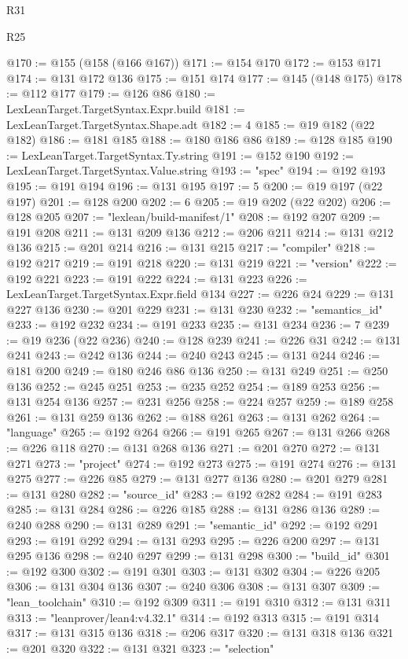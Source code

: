 \begin{lexlean}{R31}
\begin{lexlean}{R25}
\begin{coremodule}
{{{{{{{{{{{{{{{{{{{{{{{{{{{{{{{{{{{{{{{{{{{{{{{{{{{{{{{{{{{{{{{{{{{{{{{{{{{{{{{{{{{{{{{{{{{{{{{{{{{{{{{{{{{{{{{{{{{{{{{{{{{{{{{{{{{{{{{{{{{{{{{{{{{{{{{{{{{{{{{{{{{{{{{{{{{{{{{{{{{{{{{{{{{{{{{{{{{{{{{@170 := @155 (@158 (@166 @167))
@171 := @154 @170
@172 := @153 @171
@174 := @131 @172 @136
@175 := @151 @174
@177 := @145 (@148 @175)
@178 := @112 @177
@179 := @126 @86
@180 := LexLeanTarget.TargetSyntax.Expr.build
@181 := LexLeanTarget.TargetSyntax.Shape.adt
@182 := 4
@185 := @19 @182 (@22 @182)
@186 := @181 @185
@188 := @180 @186 @86
@189 := @128 @185
@190 := LexLeanTarget.TargetSyntax.Ty.string
@191 := @152 @190
@192 := LexLeanTarget.TargetSyntax.Value.string
@193 := "spec"
@194 := @192 @193
@195 := @191 @194
@196 := @131 @195
@197 := 5
@200 := @19 @197 (@22 @197)
@201 := @128 @200
@202 := 6
@205 := @19 @202 (@22 @202)
@206 := @128 @205
@207 := "lexlean/build-manifest/1"
@208 := @192 @207
@209 := @191 @208
@211 := @131 @209 @136
@212 := @206 @211
@214 := @131 @212 @136
@215 := @201 @214
@216 := @131 @215
@217 := "compiler"
@218 := @192 @217
@219 := @191 @218
@220 := @131 @219
@221 := "version"
@222 := @192 @221
@223 := @191 @222
@224 := @131 @223
@226 := LexLeanTarget.TargetSyntax.Expr.field @134
@227 := @226 @24
@229 := @131 @227 @136
@230 := @201 @229
@231 := @131 @230
@232 := "semantics_id"
@233 := @192 @232
@234 := @191 @233
@235 := @131 @234
@236 := 7
@239 := @19 @236 (@22 @236)
@240 := @128 @239
@241 := @226 @31
@242 := @131 @241
@243 := @242 @136
@244 := @240 @243
@245 := @131 @244
@246 := @181 @200
@249 := @180 @246 @86 @136
@250 := @131 @249
@251 := @250 @136
@252 := @245 @251
@253 := @235 @252
@254 := @189 @253
@256 := @131 @254 @136
@257 := @231 @256
@258 := @224 @257
@259 := @189 @258
@261 := @131 @259 @136
@262 := @188 @261
@263 := @131 @262
@264 := "language"
@265 := @192 @264
@266 := @191 @265
@267 := @131 @266
@268 := @226 @118
@270 := @131 @268 @136
@271 := @201 @270
@272 := @131 @271
@273 := "project"
@274 := @192 @273
@275 := @191 @274
@276 := @131 @275
@277 := @226 @85
@279 := @131 @277 @136
@280 := @201 @279
@281 := @131 @280
@282 := "source_id"
@283 := @192 @282
@284 := @191 @283
@285 := @131 @284
@286 := @226 @185
@288 := @131 @286 @136
@289 := @240 @288
@290 := @131 @289
@291 := "semantic_id"
@292 := @192 @291
@293 := @191 @292
@294 := @131 @293
@295 := @226 @200
@297 := @131 @295 @136
@298 := @240 @297
@299 := @131 @298
@300 := "build_id"
@301 := @192 @300
@302 := @191 @301
@303 := @131 @302
@304 := @226 @205
@306 := @131 @304 @136
@307 := @240 @306
@308 := @131 @307
@309 := "lean_toolchain"
@310 := @192 @309
@311 := @191 @310
@312 := @131 @311
@313 := "leanprover/lean4:v4.32.1"
@314 := @192 @313
@315 := @191 @314
@317 := @131 @315 @136
@318 := @206 @317
@320 := @131 @318 @136
@321 := @201 @320
@322 := @131 @321
@323 := "selection"
}}}}}}}}}}}}}}}}}}}}}}}}}}}}}}}}}}}}}}}}}}}}}}}}}}}}}}}}}}}}}}}}}}}}}}}}}}}}}}}}}}}}}}}}}}}}}}}}}}}}}}}}}}}}}}}}}}}}}}}}}}}}}}}}}}}}}}}}}}}}}}}}}}}}}}}}}}}}}}}}}}}}}}}}}}}}}}}}}}}}}}}}}}}}}}}}}}}}}}}
\end{coremodule}
\end{lexlean}
\end{lexlean}
